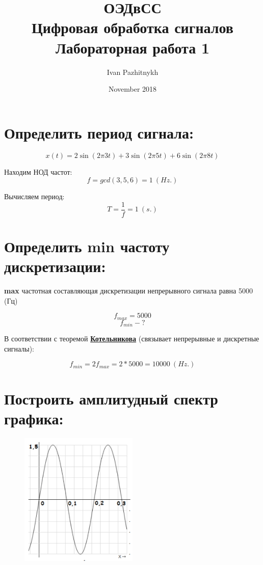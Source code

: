 \documentclass{article}
\title{
    ОЭДвСС\\
    Цифровая обработка сигналов\\
    Лабораторная работа 1
}
\author{Ivan Pazhitnykh}
\date{November 2018}
\begin{document}
\maketitle

\section{Определить период сигнала:}
\begin{equation}
    x(t) = 2\sin(2\pi 3t)+3\sin(2\pi 5t)+6\sin(2\pi 8t)
\end{equation}

Находим НОД частот:
\begin{equation*}
    f = gcd(3, 5, 6) = 1\:(Hz.)
\end{equation*}

Вычисляем период:
\begin{equation*}
    T = \frac{1}{f} = 1\:(s.)
\end{equation*}

\section{Определить min частоту дискретизации:}

\textbf{max} частотная составляющая дискретизации непрерывного сигнала равна 5000 (Гц)

\begin{equation*}f_{max} = 5000\end{equation*}
\begin{equation*}f_{min} - ?\end{equation*}

В соответствии с теоремой \textbf{\href{http://bit.ly/2AknLuQ}{Котельникова}} (связывает непрерывные и дискретные сигналы):

\begin{equation*}
    f_{min} = 2f_{max} = 2 * 5000 = 10000\:(Hz.)
\end{equation*}

\newpage
\section{Построить амплитудный спектр графика:}
\begin{figure}[h]
    \centering
    \includegraphics[width=0.5\textwidth]{task3.png}
\end{figure}
\end{document}
